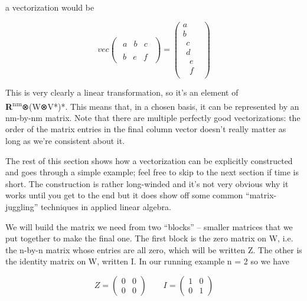 \documentclass[oneside,english]{amsbook}
\numberwithin{section}{chapter}
\theoremstyle{plain}
\theoremstyle{definition}
\begin{document}
a vectorization would be

\[vec\begin{pmatrix}
	\begin{matrix}
		a & b & c
	\end{matrix} \\
	\begin{matrix}
		b & e & f
	\end{matrix}
\end{pmatrix} = \begin{pmatrix}
	a \\
	b \\
	\begin{matrix}
		c \\
		d \\
		\begin{matrix}
			e \\
			f
		\end{matrix}
	\end{matrix}
\end{pmatrix}\]

This is very clearly a linear transformation, so it's an element of
\textbf{R}\textsuperscript{nm}⊗(W⊗V*)*. This means that, in a chosen
basis, it can be represented by an nm-by-nm matrix. Note that there are
multiple perfectly good vectorizations: the order of the matrix entries
in the final column vector doesn't really matter as long as we're
consistent about it.

The rest of this section shows how a vectorization can be explicitly
constructed and goes through a simple example; feel free to skip to the
next section if time is short. The construction is rather long-winded
and it's not very obvious why it works until you get to the end but it
does show off some common ``matrix-juggling'' techniques in applied
linear algebra.

We will build the matrix we need from two ``blocks'' -- smaller matrices
that we put together to make the final one. The first block is the zero
matrix on W, i.e. the n-by-n matrix whose entries are all zero, which
will be written Z. The other is the identity matrix on W, written I. In
our running example n = 2 so we have

\[Z = \begin{pmatrix}
	0 & 0 \\
	0 & 0
\end{pmatrix}\ \ \ \ \ \ \ \ \ I = \begin{pmatrix}
	1 & 0 \\
	0 & 1
\end{pmatrix}\]
\end{document}
